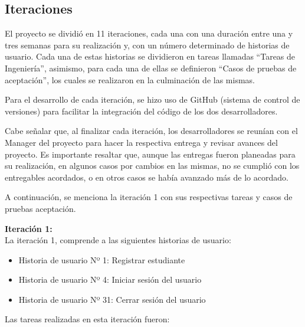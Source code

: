 \subsection{Iteraciones}
El proyecto se dividió en 11 iteraciones, cada una con una duración entre una y tres semanas para su realización y, con un número determinado de historias de usuario. Cada una de estas historias se dividieron en tareas llamadas “Tareas de Ingeniería”, asimismo, para cada una de ellas se definieron “Casos de pruebas de aceptación”, los cuales se realizaron en la culminación de las mismas.

Para el desarrollo de cada iteración, se hizo uso de GitHub (sistema de control de versiones) para facilitar la integración del código de los dos desarrolladores.

Cabe señalar que, al finalizar cada iteración, los desarrolladores se reunían con el Manager del proyecto para hacer la respectiva entrega y revisar avances del proyecto. Es importante resaltar que, aunque las entregas fueron planeadas para su realización, en algunos casos por cambios en las mismas, no se cumplió con los entregables acordados, o en otros casos se había avanzado más de lo acordado. 

A continuación, se menciona la iteración 1 con sus respectivas tareas y casos de pruebas aceptación.

\textbf{Iteración 1: }\ \\
La iteración 1, comprende a las siguientes historias de usuario:
\begin{itemize}
    \item Historia de usuario Nº 1: Registrar estudiante
    \item Historia de usuario Nº 4: Iniciar sesión del usuario
    \item Historia de usuario Nº 31: Cerrar sesión del usuario
\end{itemize}

Las tareas realizadas en esta iteración fueron:


